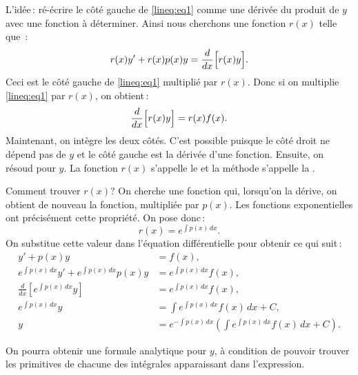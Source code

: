 L'idée\,: ré-écrire le côté gauche de  \eqref{lineq:eq1} comme une dérivée du produit de $y$ avec une fonction à déterminer.  Ainsi nous cherchons une fonction $r(x)$ telle que \,:
\begin{equation*}
r(x) y' + r(x) p(x) y = \frac{d}{dx}\Bigl[ r(x) y \Bigr] .
\end{equation*}
Ceci est le côté gauche de 
\eqref{lineq:eq1} multiplié par $r(x)$.  Donc si on multiplie \eqref{lineq:eq1} par
$r(x)$, on obtient\,:
\begin{equation*}
\frac{d}{dx}\Bigl[ r(x) y \Bigr] = r(x)f(x) .
\end{equation*}
Maintenant, on intègre les deux côtés. 
C'est possible puisque le côté droit ne dépend pas de $y$ et le côté gauche est la dérivée d'une fonction.  Ensuite, on résoud pour  $y$.
La fonction $r(x)$ s'appelle le \emph{} et la méthode s'appelle la 
\emph{}.

Comment trouver $r(x)$?  On cherche une fonction qui, lorsqu'on la dérive, on obtient de nouveau la fonction, multipliée par $p(x)$.  Les fonctions exponentielles ont précisément cette propriété.  On pose donc\,: 
%
\begin{equation*}
r(x) = e^{\int p(x) \,dx} .
\end{equation*}
On substitue cette valeur dans l'équation différentielle pour obtenir ce qui suit\,: 
\begin{align*}
y' + p(x) y &= f(x) , \\
e^{\int p(x) \,dx} y' + e^{\int p(x) \,dx} p(x) y & = e^{\int p(x) \,dx} f(x) , \\
\frac{d}{dx}\left[ e^{\int p(x) \,dx} y \right] & = e^{\int p(x) \,dx} f(x) , \\
e^{\int p(x) \,dx} y & = \int e^{\int p(x) \,dx} f(x) \,dx + C , \\
y & = e^{-\int p(x) \,dx} \left( \int e^{\int p(x) \,dx} f(x) \,dx + C \right) .
\end{align*}

On pourra obtenir une formule analytique pour $y$, à condition de pouvoir trouver les primitives de chacune des intégrales apparaissant dans l'expression.

